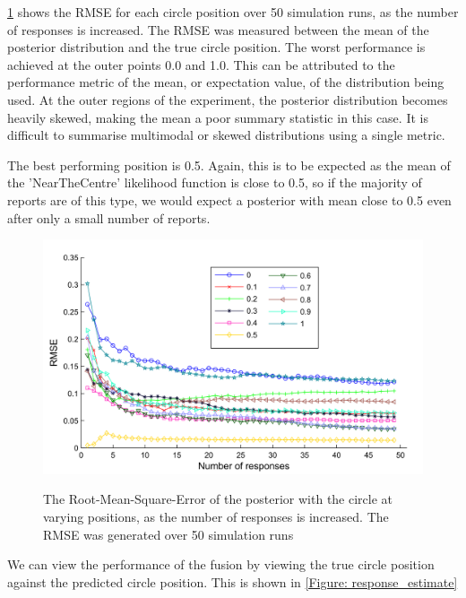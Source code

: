 \ref{Figure:MC RMSE} shows the RMSE for each circle position over 50 simulation runs, as the number of responses is increased. The RMSE was measured between the mean of the posterior distribution and the true circle position. The worst performance is achieved at the outer points 0.0 and 1.0. This can be attributed to the performance metric of the mean, or expectation value, of the distribution being used. At the outer regions of the experiment, the posterior distribution becomes heavily skewed, making the mean a poor summary statistic in this case. It is difficult to summarise multimodal or skewed distributions using a single metric.

The best performing position is 0.5. Again, this is to be expected as the mean of the 'NearTheCentre' likelihood function is close to 0.5, so if the majority of reports are of this type, we would expect a posterior with mean close to 0.5 even after only a small number of reports.


\begin{figure}
	\centering
	\includegraphics[scale=1]{line_RMSE.png}
	\label{Figure:MC RMSE}
	\caption{The Root-Mean-Square-Error of the posterior with the circle at varying positions, as the number of responses is increased. The RMSE was generated over 50 simulation runs}
\end{figure}


We can view the performance of the fusion by viewing the true circle position against the predicted circle position. This is shown in \ref{Figure: response_estimate}

